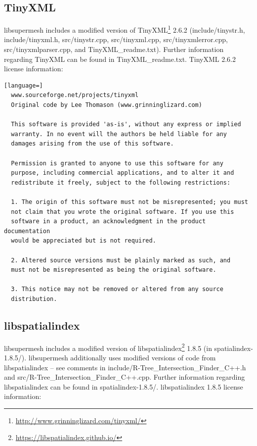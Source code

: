 \documentclass{article}
\begin{document}
\subsection{TinyXML}

libsupermesh includes a modified version of
TinyXML\footnote{\url{http://www.grinninglizard.com/tinyxml/}} 2.6.2
(include/tinystr.h, include/tinyxml.h, \linebreak src/tinystr.cpp,
src/tinyxml.cpp, src/tinyxmlerror.cpp, src/tinyxmlparser.cpp, and
TinyXML\_readme.txt). Further information regarding TinyXML can be found in
TinyXML\_readme.txt. TinyXML 2.6.2 license information:

\begin{lstlisting}[language=]
  www.sourceforge.net/projects/tinyxml
  Original code by Lee Thomason (www.grinninglizard.com)

  This software is provided 'as-is', without any express or implied
  warranty. In no event will the authors be held liable for any
  damages arising from the use of this software.

  Permission is granted to anyone to use this software for any
  purpose, including commercial applications, and to alter it and
  redistribute it freely, subject to the following restrictions:

  1. The origin of this software must not be misrepresented; you must
  not claim that you wrote the original software. If you use this
  software in a product, an acknowledgment in the product documentation
  would be appreciated but is not required.

  2. Altered source versions must be plainly marked as such, and
  must not be misrepresented as being the original software.

  3. This notice may not be removed or altered from any source
  distribution.
\end{lstlisting}

\subsection{libspatialindex}

libsupermesh includes a modified version of
libspatialindex\footnote{\url{https://libspatialindex.github.io/}} 1.8.5
(in spatialindex-1.8.5/). libsupermesh additionally uses modified versions of
code from libspatialindex -- see comments in \linebreak
include/R-Tree\_Intersection\_Finder\_C++.h and
src/R-Tree\_Intersection\_Finder\_C++.cpp. Further information regarding
libspatialindex can be found in spatialindex-1.8.5/. libspatialindex 1.8.5
license information:
\end{document}
